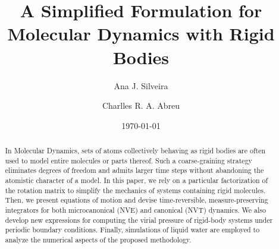 \documentclass[aip,jcp,reprint,amsmath,amssymb]{revtex4-1}
\begin{document}
\title{A Simplified Formulation for Molecular Dynamics with Rigid Bodies}

\author{Ana J. Silveira}

\author{Charlles R. A. Abreu}

\date{\today}

\begin{abstract}
In Molecular Dynamics, sets of atoms collectively behaving as rigid bodies are often used to model entire molecules or parts thereof. Such a coarse-graining strategy eliminates degrees of freedom and admits larger time steps without abandoning the atomistic character of a model. In this paper, we rely on a particular factorization of the rotation matrix to simplify the mechanics of systems containing rigid molecules. Then, we present equations of motion and devise time-reversible, measure-preserving integrators for both microcanonical (NVE) and canonical (NVT) dynamics. We also develop new expressions for computing the virial pressure of rigid-body systems under periodic boundary conditions. Finally, simulations of liquid water are employed to analyze the numerical aspects of the proposed methodology.
\end{abstract}

\maketitle
\end{document}
